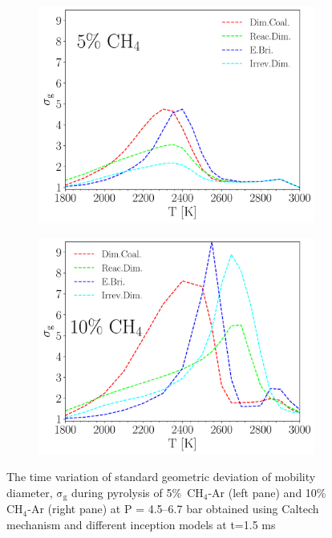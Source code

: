 \begin{figure}[H]
	\centering
	\begin{subfigure}[t]{0.4\textwidth}
		\includegraphics[width=1\textwidth]{Figures/Results/Shocktube/Agafonov2016/5CH4/sigma.pdf}
	\end{subfigure}
	\begin{subfigure}[t]{0.4\textwidth}
		\includegraphics[width=1\textwidth]{Figures/Results/Shocktube/Agafonov2016/10CH4/sigma.pdf}
	\end{subfigure}
	\caption{The time variation of standard geometric deviation of mobility diameter, $\mathrm{\sigma_{g}}$ during pyrolysis of 5\%~$\mathrm{CH_4}$-Ar (left pane) and 10\%~$\mathrm{CH_4}$-Ar (right pane) at $\mathrm{P}$ = 4.5–6.7 bar obtained using Caltech mechanism and different inception models at t=1.5 ms}
	\label{fig:shocktubesigma} 
\end{figure}

